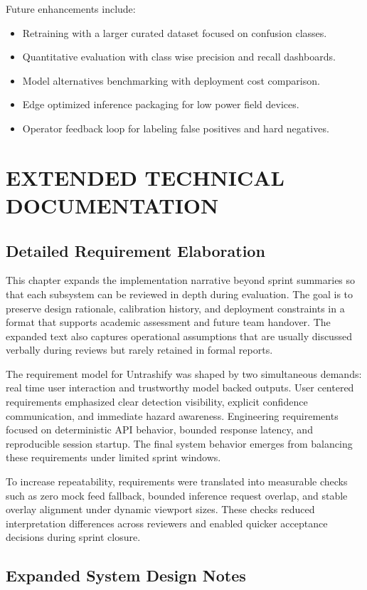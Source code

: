 \documentclass[12pt,a4paper]{report}
\begin{document}
Future enhancements include:
\begin{itemize}
    \item Retraining with a larger curated dataset focused on confusion classes.
    \item Quantitative evaluation with class wise precision and recall dashboards.
    \item Model alternatives benchmarking with deployment cost comparison.
    \item Edge optimized inference packaging for low power field devices.
    \item Operator feedback loop for labeling false positives and hard negatives.
\end{itemize}

\chapter{EXTENDED TECHNICAL DOCUMENTATION}
\section{Detailed Requirement Elaboration}
This chapter expands the implementation narrative beyond sprint summaries so that each subsystem can be reviewed in depth during evaluation. The goal is to preserve design rationale, calibration history, and deployment constraints in a format that supports academic assessment and future team handover. The expanded text also captures operational assumptions that are usually discussed verbally during reviews but rarely retained in formal reports.

The requirement model for Untrashify was shaped by two simultaneous demands: real time user interaction and trustworthy model backed outputs. User centered requirements emphasized clear detection visibility, explicit confidence communication, and immediate hazard awareness. Engineering requirements focused on deterministic API behavior, bounded response latency, and reproducible session startup. The final system behavior emerges from balancing these requirements under limited sprint windows.

To increase repeatability, requirements were translated into measurable checks such as zero mock feed fallback, bounded inference request overlap, and stable overlay alignment under dynamic viewport sizes. These checks reduced interpretation differences across reviewers and enabled quicker acceptance decisions during sprint closure.

\section{Expanded System Design Notes}
\end{document}
